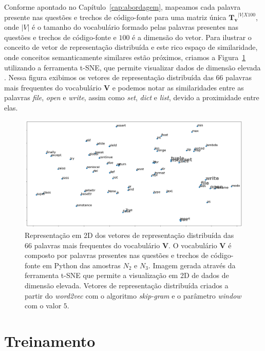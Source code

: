 Conforme apontado no Capítulo~\ref{cap:abordagem}, mapeamos cada palavra presente nas questões e trechos de código-fonte para uma matriz única $\bm{T_{v}}^{|V| X 100}$, onde $|V|$ é o tamanho do vocabulário formado pelas palavras presentes nas questões e trechos de código-fonte e $100$ é a dimensão do vetor. Para ilustrar o conceito de vetor de representação distribuída e este rico espaço de similaridade, onde conceitos semanticamente similares estão próximos, criamos a Figura~\ref{fig:tsne-code-snippet-python} utilizando a ferramenta t-SNE, que permite visualizar dados de dimensão elevada \citep{scikit-learn-tsne-2019, quora-tsne-2019}. Nessa figura exibimos os vetores de representação distribuída das 66 palavras mais frequentes do vocabulário $\bm{V}$ e podemos notar as similaridades entre as palavras \emph{file}, \emph{open}  e \emph{write}, assim como \emph{set}, \emph{dict} e \emph{list}, devido a proximidade entre elas.

\begin{figure}[H]
\includegraphics[width=1\textwidth]{figuras/cap-experimento/code_tsne.png}
\caption{Representação em 2D dos vetores de representação distribuída das 66 palavras mais frequentes do vocabulário $\bm{V}$. O vocabulário $\bm{V}$ é composto por palavras presentes nas questões e trechos de código-fonte em Python das amostras $N_{2}$ e $N_{3}$. Imagem gerada através da ferramenta t-SNE que permite a visualização em 2D de dados de dimensão elevada. Vetores de representação distribuída criados a partir do \textit{word2vec} com o algoritmo \textit{skip-gram} e o parâmetro \textit{window} com o valor $5$.}
\label{fig:tsne-code-snippet-python}
\end{figure}

\section{Treinamento}
\label{sec:treinamento}

